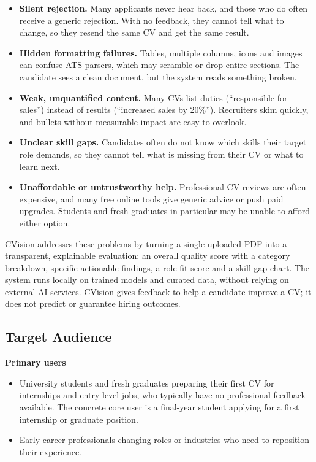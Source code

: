 \documentclass[11pt,a4paper]{article}
\begin{document}
\begin{itemize}
  \item \textbf{Silent rejection.} Many applicants never hear back, and
  those who do often receive a generic rejection. With no feedback,
  they cannot tell what to change, so they resend the same CV and get
  the same result.
  \item \textbf{Hidden formatting failures.} Tables, multiple columns,
  icons and images can confuse ATS parsers, which may scramble or drop
  entire sections. The candidate sees a clean document, but the system
  reads something broken.
  \item \textbf{Weak, unquantified content.} Many CVs list duties
  (``responsible for sales'') instead of results (``increased sales by
  20\%''). Recruiters skim quickly, and bullets without measurable
  impact are easy to overlook.
  \item \textbf{Unclear skill gaps.} Candidates often do not know which
  skills their target role demands, so they cannot tell what is missing
  from their CV or what to learn next.
  \item \textbf{Unaffordable or untrustworthy help.} Professional CV
  reviews are often expensive, and many free online tools give generic
  advice or push paid upgrades. Students and fresh graduates in
  particular may be unable to afford either option.
\end{itemize}

CVision addresses these problems by turning a single uploaded PDF into
a transparent, explainable evaluation: an overall quality score with a
category breakdown, specific actionable findings, a role-fit score and a
skill-gap chart. The system runs locally on trained models and curated
data, without relying on external AI services. CVision gives feedback to
help a candidate improve a CV; it does not predict or guarantee hiring
outcomes.

\subsection{Target Audience}

\textbf{Primary users}
\begin{itemize}
  \item University students and fresh graduates preparing their first CV
  for internships and entry-level jobs, who typically have no
  professional feedback available. The concrete core user is a
  final-year student applying for a first internship or graduate
  position.
  \item Early-career professionals changing roles or industries who need
  to reposition their experience.
\end{itemize}
\end{document}
